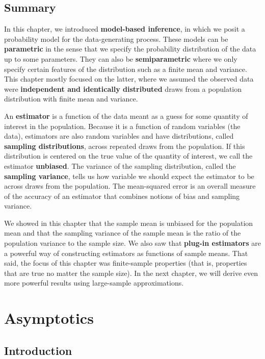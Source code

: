 \documentclass[
  13pt,
  letterpaper,
  DIV=11,
  numbers=noendperiod]{scrreprt}
\theoremstyle{definition}
\theoremstyle{definition}
\theoremstyle{plain}
\theoremstyle{remark}
\begin{document}
\section{Summary}\label{summary-1}

In this chapter, we introduced \textbf{model-based inference}, in which
we posit a probability model for the data-generating process. These
models can be \textbf{parametric} in the sense that we specify the
probability distribution of the data up to some parameters. They can
also be \textbf{semiparametric} where we only specify certain features
of the distribution such as a finite mean and variance. This chapter
mostly focused on the latter, where we assumed the observed data were
\textbf{independent and identically distributed} draws from a population
distribution with finite mean and variance.

An \textbf{estimator} is a function of the data meant as a guess for
some quantity of interest in the population. Because it is a function of
random variables (the data), estimators are also random variables and
have distributions, called \textbf{sampling distributions}, across
repeated draws from the population. If this distribution is centered on
the true value of the quantity of interest, we call the estimator
\textbf{unbiased}. The variance of the sampling distribution, called the
\textbf{sampling variance}, tells us how variable we should expect the
estimator to be across draws from the population. The mean-squared error
is an overall measure of the accuracy of an estimator that combines
notions of bias and sampling variance.

We showed in this chapter that the sample mean is unbiased for the
population mean and that the sampling variance of the sample mean is the
ratio of the population variance to the sample size. We also saw that
\textbf{plug-in estimators} are a powerful way of constructing
estimators as functions of sample means. That said, the focus of this
chapter was finite-sample properties (that is, properties that are true
no matter the sample size). In the next chapter, we will derive even
more powerful results using large-sample approximations.

\chapter{Asymptotics}\label{sec-asymptotics}

\section{Introduction}\label{introduction-2}
\end{document}
